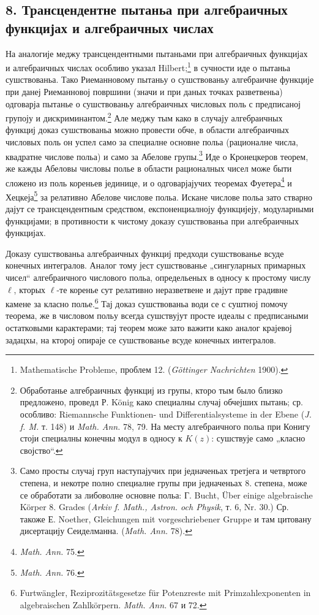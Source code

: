 ﻿\documentclass[11pt]{article}
\begin{document}
\subsection*{8. Трансцендентне пытаньа при алгебраичных функцијах и алгебраичных числах}
На аналогије меджу трансцендентными пытаньами при алгебраичных функцијах и алгебраичных числах особливо указал Hilbert;\footnote{Mathematische Probleme, проблем 12. (\emph{Göttinger Nachrichten} 1900).} в сучности иде о пытаньа сушствованьа. Тако Риеманновому пытаньу о сушствованьу алгебраичне функције при данеј Риеманновој површини (значи и при даных точках разветвеньа) одговарја пытанье о сушствованьу алгебраичных числовых поль с предписаној групоју и дискриминантом.\footnote{Обработанье алгебраичных функциј из групы, кторо тым было близко предложено, проведл Р. König како специалны случај обчејших пытань; ср. особливо: Riemannsche Funktionen- und Differentialsysteme in der Ebene (\emph{J. f. M.} т. 148) и \emph{Math. Ann.} 78, 79. На месту алгебраичного польа при Конигу стоји специалны конечны модул в односу к \(K(z)\): сушствује само „класно својство“.} Але меджу тым како в случају алгебраичных функциј доказ сушствованьа можно провести обче, в области алгебраичных числовых поль он успел само за специалне основне польа (рационалне числа, квадратне числове польа) и само за Абелове групы.\footnote{Само просты случај груп наступајучих при једначеньах третјега и четвртого степена, и некотре полно специалне групы при једначеньах 8. степена, може се обработати за либоволне основне польа: Г. Bucht, Über einige algebraische Körper 8. Grades (\emph{Arkiv f. Math., Astron. och Physik}, т. 6, Nr. 30.) Ср. такоже Е. Noether, Gleichungen mit vorgeschriebener Gruppe и там цитовану дисертацију Сеиделманна. (\emph{Math. Ann.} 78).} Иде о Кронецкеров теорем, же кажды Абеловы числовы полье в области рационалных чисел може быти сложено из поль кореньев јединице, и о одговарјајучих теоремах Фуетера\footnote{\emph{Math. Ann.} 75.} и Хецкеја\footnote{\emph{Math. Ann.} 76.} за релативно Абелове числове польа. Искане числове польа зато стварно дајут се трансцендентным средством, експоненциалноју функцијеју, модуларными функцијами; в противности к чистому доказу сушствованьа при алгебраичных функцијах.

Доказу сушствованьа алгебраичных функциј предходи сушствованье всуде конечных интегралов. Аналог тому јест сушствованье „сингуларных примарных чисел“ алгебраичного числового польа, определьеных в односу к простому числу \(\ell\), кторых \(\ell\)-те коренье сут релативно неразветвене и дајут прве градивне камене за класно полье.\footnote{Furtwängler, Reziprozitätsgesetze für Potenzreste mit Primzahlexponenten in algebraischen Zahlkörpern. \emph{Math. Ann.} 67 и 72.} Тај доказ сушствованьа води се с суштној помочу теорема, же в числовом польу всегда сушствујут просте идеалы с предписаными остатковыми карактерами; тај теорем може зато важити како аналог крајевој задацхы, на кторој опираје се сушствованье всуде конечных интегралов.
\end{document}
